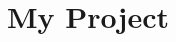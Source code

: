 \documentclass[twoside,openright,12pt]{book}
\begin{document}
	
\chapter{My Project}


\end{document}
